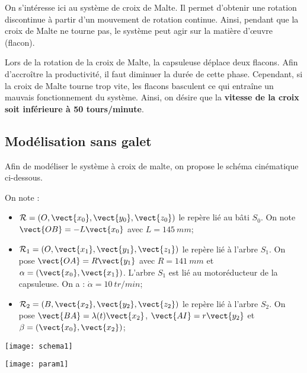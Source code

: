 On s'intéresse ici au système de croix de Malte. Il permet d'obtenir une rotation discontinue à partir d'un mouvement de rotation continue. Ainsi, pendant que la croix de Malte ne tourne pas, le système peut agir sur la matière d'\oe{}uvre (flacon).

Lors de la rotation de la croix de Malte, la capsuleuse déplace deux flacons. Afin d'accroître la productivité, il faut diminuer la durée de cette phase. Cependant, si la croix de Malte tourne trop vite, les flacons basculent ce qui entraîne un mauvais fonctionnement du système. Ainsi, on désire que la \textbf{vitesse de la croix soit inférieure à 50 tours/minute}. 

\fi


\subsection*{Modélisation sans galet}

\ifprof
\else
Afin de modéliser le système à croix de malte, on propose le schéma cinématique ci-dessous. 


On note :
\begin{itemize}
\item $\mathcal{R}=\left( O,\vect{x_0},\vect{y_0},\vect{z_0}\right)$ le repère lié au bâti $S_0$. On note $\vect{OB}=-L\vect{x_0}$ avec $L = \SI{145}{mm}$;
\item $\mathcal{R}_1=\left( O,\vect{x_1},\vect{y_1},\vect{z_1}\right)$ le repère lié à l'arbre $S_1$. On pose $\vect{OA}=R\vect{y_1}$  avec $R =\SI{141}{mm}$ et $\alpha = \left( \vect{x_0}, \vect{x_1}\right)$. L'arbre $S_1$ est lié au motoréducteur de la capsuleuse. On a : $\dot{\alpha} = \SI{10}{tr/min}$;
\item  $\mathcal{R}_2=\left( B,\vect{x_2},\vect{y_2},\vect{z_2}\right)$ le repère lié à l'arbre $S_2$. On pose $\vect{BA}=\lambda(t)\vect{x_2}$,  $\vect{AI}=r\vect{y_2}$ et $\beta = \left( \vect{x_0}, \vect{x_2}\right)$;
\end{itemize}


\begin{center}
 \texttt{[image: schema1]}
\end{center}
\fi



\ifprof%
\begin{corrige}
\begin{center}
 \texttt{[image: param1]}
\end{center}
\end{corrige}
\else \fi

